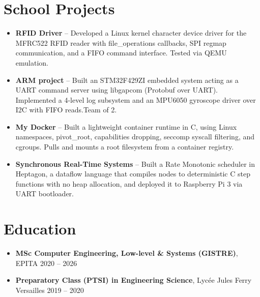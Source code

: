 \documentclass[9pt,a4paper]{article}
\begin{document}
\section*{School Projects}
\begin{tcolorbox}[mybox]
\begin{itemize}
\item \textbf{RFID Driver} -- Developed a Linux kernel character device driver for the MFRC522 RFID reader with file\_operations callbacks, SPI regmap communication, and a FIFO command interface. Tested via QEMU emulation.

\item \textbf{ARM project} -- Built an STM32F429ZI embedded system acting as a UART command server using libgapcom (Protobuf over UART). Implemented a 4-level log subsystem and an MPU6050 gyroscope driver over I2C with FIFO reads.Team of 2.

\item \textbf{My Docker} -- Built a lightweight container runtime in C, using Linux namespaces, pivot\_root, capabilities dropping, seccomp syscall filtering, and cgroups. Pulls and mounts a root filesystem from a container registry.

\item \textbf{Synchronous Real-Time Systems} -- Built a Rate Monotonic scheduler in Heptagon, a dataflow language that compiles nodes to deterministic C step functions with no heap allocation, and deployed it to Raspberry Pi 3 via UART bootloader.
\end{itemize}
\end{tcolorbox}


\section*{Education}
\begin{tcolorbox}[mybox]
\begin{itemize}
\item \textbf{MSc Computer Engineering, Low-level \& Systems (GISTRE)}, EPITA {\small{\hfill 2020 – 2026}}

\item \textbf{Preparatory Class (PTSI) in Engineering Science}, Lycée Jules Ferry Versailles {\small{\hfill 2019 – 2020}}
\end{itemize}
\end{tcolorbox}
\end{document}
